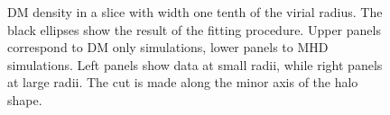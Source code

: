 \documentclass[a4paper,fleqn,usenatbib]{mnras}
\begin{document}
\begin{figure}
  \hfill
  \hfill 
  \caption{DM density in a slice with width one tenth of the virial radius.
  The black ellipses show the result of the fitting procedure. 
  Upper panels correspond to DM only simulations, lower panels to MHD simulations.
  Left panels show data at small radii, while right panels at large
  radii.
  The cut is made along the minor axis of the halo shape.}
\label{fig:slices}
\end{figure}
\end{document}

